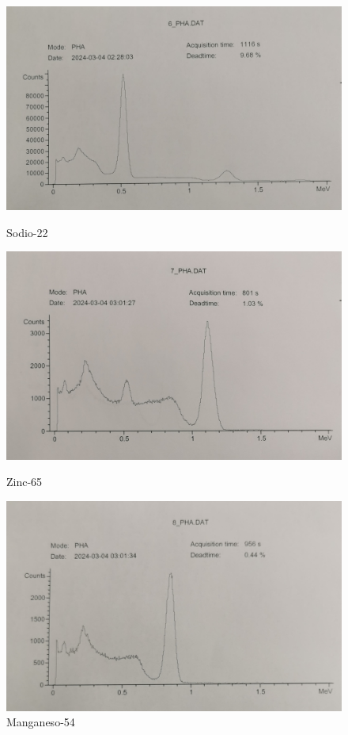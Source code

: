 \documentclass[a4paper,12pt,spanish]{article}
\begin{document}
\begin{figure}[H]
		\begin{minipage}{0.45\textwidth}
			\centering
			\includegraphics[width=1.1\linewidth]{../graficas_procesadas/PHA_6}
			\caption{Sodio-22}
			\label{fig:pha6}
		\end{minipage}\hfill
		\begin{minipage}{0.45\textwidth}
			\centering
			\includegraphics[width=1.1\linewidth]{../graficas_procesadas/PHA_7}
			\caption{Zinc-65}
			\label{fig:pha7}
		\end{minipage}
		
		\begin{minipage}{0.45\textwidth}
			\centering
			\includegraphics[width=1.1\linewidth]{../graficas_procesadas/PHA_8}
			\caption{Manganeso-54}
			\label{fig:pha8}
		\end{minipage}\hfill
		
	\end{figure}
	
\end{document}
